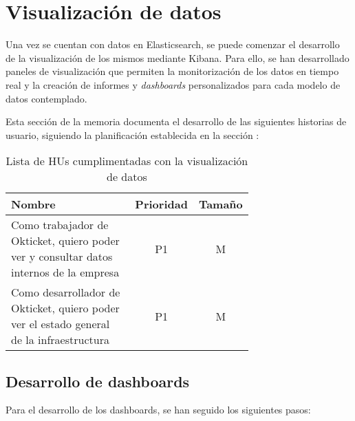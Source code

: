 \section{Visualización de datos}\label{sec:impl_visualizacion}
Una vez se cuentan con datos en Elasticsearch, se puede comenzar el desarrollo
de la visualización de los mismos mediante Kibana. Para ello, se han desarrollado
paneles de visualización que permiten la monitorización de los datos en tiempo
real y la creación de informes y \textit{dashboards} personalizados para cada
modelo de datos contemplado.

Esta sección de la memoria documenta el desarrollo de las siguientes historias
de usuario, siguiendo la planificación establecida en la sección :

\begin{table}[H]
	\centering
	\begin{tabular}{|p{0.7\linewidth}|c|c|}
		\hline
		\textbf{Nombre} & \textbf{Prioridad} & \textbf{Tamaño} \\
		\hline
		\hline
		Como trabajador de Okticket, quiero poder ver y consultar datos internos de la empresa & P1\cellcolor{orange!50} & M\cellcolor{yellow!50} \\
		\hline
		Como desarrollador de Okticket, quiero poder ver el estado general de la infraestructura & P1\cellcolor{orange!50} & M\cellcolor{yellow!50} \\
		\hline
  \end{tabular}
  \caption{Lista de HUs cumplimentadas con la visualización de datos}
  \label{tab:impl_visualizacion}
\end{table}


\newpage{}
\subsection{Desarrollo de dashboards}
Para el desarrollo de los dashboards, se han seguido los siguientes pasos:

